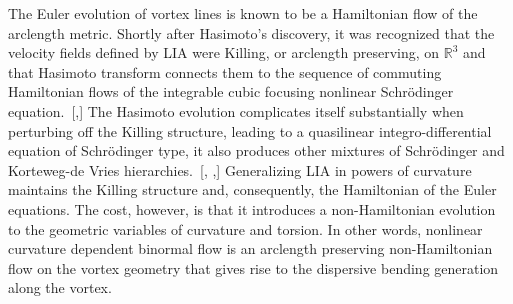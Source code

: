 \documentclass[aps,graphicx,reprint,onecolumn,12pt,tightenlines,longbibliography]{revtex4-1}
\newcommand{\sas}[2]{{#2}}
\begin{document}
The Euler evolution of vortex lines is known to be a Hamiltonian flow of the arclength metric. Shortly after Hasimoto's discovery, it was recognized that the velocity fields defined by LIA were Killing, or arclength preserving, on $\mathbb{R}^{3}$ and that Hasimoto transform connects  them to the sequence of commuting Hamiltonian flows of the integrable cubic focusing nonlinear Schr\"odinger equation.~[,]  The Hasimoto evolution complicates itself substantially when perturbing off the Killing structure, leading to a quasilinear integro-differential equation of Schr\"odinger type, it also produces other mixtures \sas{}{of} Schr\"odinger and Korteweg-de Vries hierarchies.~[, ,] Generalizing LIA in powers of curvature maintains the Killing structure and, consequently, the Hamiltonian of the Euler equations. The cost, however, is that it introduces a non-Hamiltonian evolution to the  geometric variables of curvature and torsion. In other words, nonlinear curvature dependent binormal flow is an arclength preserving non-Hamiltonian flow on the vortex geometry that gives rise  to the \sas{non-Hamiltonian}{dispersive} bending \sas{}{generation} along the vortex.  
\end{document}
